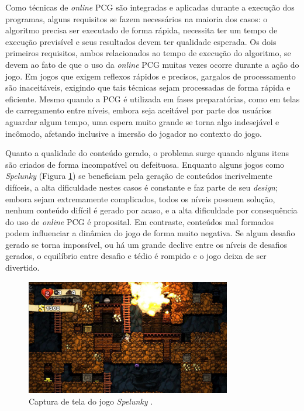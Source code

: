 Como técnicas de \emph{online} PCG são integradas e aplicadas durante a execução dos programas, alguns requisitos se fazem necessários na maioria dos casos: o algoritmo precisa ser executado de forma rápida, necessita ter um tempo de execução previsível e seus resultados devem ter qualidade esperada. Os dois primeiros requisitos, ambos relacionados ao tempo de execução do algoritmo, se devem ao fato de que o uso da \emph{online} PCG muitas vezes ocorre durante a ação do jogo. Em jogos que exigem reflexos rápidos e precisos, gargalos de processamento são inaceitáveis, exigindo que tais técnicas sejam processadas de forma rápida e eficiente. Mesmo quando a PCG é utilizada em fases preparatórias, como em telas de carregamento entre níveis, embora seja aceitável por parte dos usuários aguardar algum tempo, uma espera muito grande se torna algo indesejável e incômodo, afetando inclusive a imersão do jogador no contexto do jogo.

Quanto a qualidade do conteúdo gerado, o problema surge quando alguns itens são criados de forma incompatível ou defeituosa. Enquanto alguns jogos como \emph{Spelunky} \cite{game:spelunky} (Figura \ref{fig:game_spelunky}) se beneficiam pela geração de conteúdos incrivelmente difíceis, a alta dificuldade nestes casos é constante e faz parte de seu \emph{design}; embora sejam extremamente complicados, todos os níveis possuem solução, nenhum conteúdo difícil é gerado por acaso, e a alta dificuldade por consequência do uso de \emph{online} PCG é proposital. Em contraste, conteúdos mal formados podem influenciar a dinâmica do jogo de forma muito negativa. Se algum desafio gerado se torna impossível, ou há um grande declive entre os níveis de desafios gerados, o equilíbrio entre desafio e tédio é rompido e o jogo deixa de ser divertido.

\begin{figure}[htb]
	\begin{center}
		\includegraphics[width=0.8\textwidth]{Imagens/game_spelunky.jpg}
		\caption{Captura de tela do jogo \emph{Spelunky} \cite{game:spelunky}.}
		\label{fig:game_spelunky}
	\end{center}
\end{figure}

